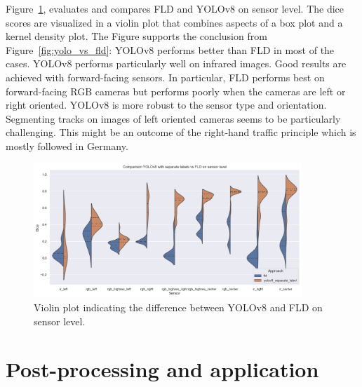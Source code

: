\documentclass[Master,MDS,english]{BASE/twbook} %
\begin{document}
Figure~\ref{fig:yolo_models}, evaluates and compares FLD and YOLOv8 on sensor level. 
The dice scores are visualized in a violin plot that combines aspects of a box plot and a kernel density plot. 
The Figure supports the conclusion from Figure~\ref{fig:yolo_vs_fld}: YOLOv8 performs better than FLD in most of the cases. YOLOv8 performs particularly well on infrared images. Good results are achieved with forward-facing sensors. In particular, FLD performs best on forward-facing RGB cameras but performs poorly when the cameras are left or right oriented. YOLOv8 is more robust to the sensor type and orientation. Segmenting tracks on images of left oriented cameras seems to be particularly challenging. This might be an outcome of the right-hand traffic principle which is mostly followed in Germany.


\begin{figure}[h]
\centering
\includegraphics[width=0.9\textwidth]{images/results/violin_plot_nl}
\caption{Violin plot indicating the difference between YOLOv8 and FLD on sensor level.  }
\label{fig:yolo_models}
\end{figure}



\section{Post-processing and application}
\end{document}
